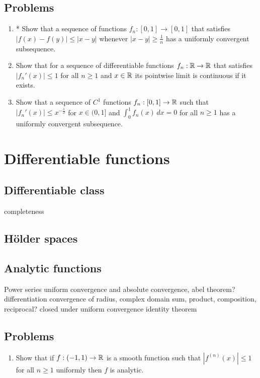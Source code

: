 \documentclass{../../large}
\begin{document}
\section*{Problems}
\begin{enumerate}
\item* Show that a sequence of functions $f_n:[0,1]\to[0,1]$ that satisfies $|f(x)-f(y)|\le|x-y|$ whenever $|x-y|\ge\frac1n$ has a uniformly convergent subsequence.
\item Show that for a sequence of differentiable functions $f_n:\mathbb{R}\to\mathbb{R}$ that satisfies $|f_n'(x)|\le1$ for all $n\ge1$ and $x\in\mathbb{R}$ its pointwise limit is continuous if it exists.
\item Show that a sequence of $C^1$ functions $f_n:[0,1]\to\mathbb{R}$ such that $|f_n'(x)|\le x^{-\frac12}$ for $x\in(0,1]$ and $\int_0^1f_n(x)\,dx=0$ for all $n\ge1$ has a uniformly convergent subsequence.
\end{enumerate}

\chapter{Differentiable functions}
\section{Differentiable class}
completeness
\section{H\"older spaces}

\section{Analytic functions}

Power series
uniform convergence and absolute convergence, abel theorem?
differentiation
convergence of radius, complex domain
sum, product, composition, reciprocal?
closed under uniform convergence
identity theorem


\section*{Problems}

	
\begin{enumerate}
\item Show that if $f:(-1,1)\to\mathbb{R}$ is a smooth function such that $|f^{(n)}(x)|\le1$ for all $n\ge1$ uniformly then $f$ is analytic.
\end{enumerate}
\end{document}
